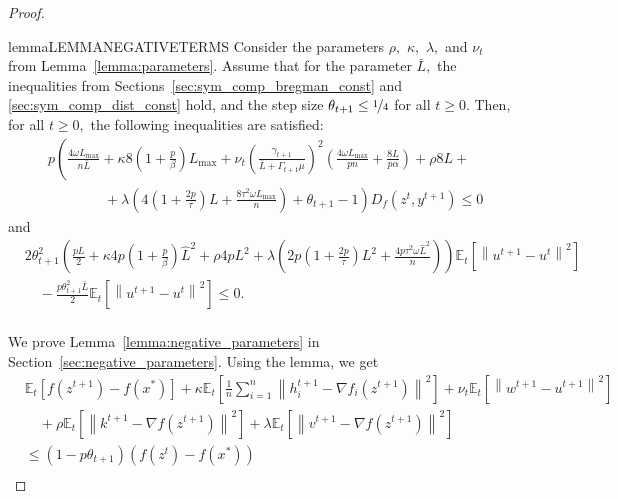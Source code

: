 \documentclass{article} %
\newcommand{\norm}[1]{\left\| #1 \right\|}
\newcommand{\ExpSub}[2]{{\mathbb{E}}_{#1}\left[#2\right]}
\theoremstyle{plain}
\theoremstyle{definition}
\theoremstyle{remark}
\begin{document}
\begin{proof}
\begin{restatable}{lemma}{LEMMANEGATIVETERMS}
    \label{lemma:negative_parameters}
    Consider the parameters $\rho,$ $\kappa,$ $\lambda,$ and $\nu_{t}$ from Lemma~\ref{lemma:parameters}. Assume that for the parameter $\bar{L},$ the inequalities from Sections~\ref{sec:sym_comp_bregman_const} and \ref{sec:sym_comp_dist_const} hold, and the step size $\theta_{t+1} \leq \nicefrac{1}{4}$ for all $t \geq 0.$ Then, for all $t \geq 0,$ the following inequalities are satisfied:
    \begin{equation}
    \begin{aligned}
      \label{eq:lemma:negative_parameters:bregman}
      &p\left(\frac{4 \omega L_{\max}}{n \bar{L}} + \kappa 8 \left(1 + \frac{p}{\beta}\right) L_{\max} + \nu_{t} \left(\frac{\gamma_{t+1}}{\bar{L} + \Gamma_{t+1} \mu}\right)^2\left(\frac{4 \omega L_{\max}}{p n} + \frac{8L}{p \alpha}\right) + \rho 8 L +  \right. \\
    &\qquad\qquad+ \left. \lambda \left(4 \left(1 + \frac{2 p}{\tau}\right) L + \frac{8 \tau^2 \omega L_{\max}}{n}\right) + \theta_{t+1} - 1\right) D_f(z^t, y^{t+1}) \leq 0
    \end{aligned}
    \end{equation}
    and
    \begin{equation}
      \begin{aligned}
      \label{eq:lemma:negative_parameters:norm}
      &2 \theta_{t+1}^2 \left(\frac{pL}{2} + \kappa 4 p \left(1 + \frac{p}{\beta}\right) \widehat{L}^2 + \rho 4 p L^2 + \lambda \left(2 p \left(1 + \frac{2 p}{\tau}\right) L^2 + \frac{4 p \tau^2 \omega \widehat{L}^2}{n}\right) \right) \ExpSub{t}{\norm{u^{t+1} - u^t}^2} \\
    &\quad - \frac{p \theta_{t+1}^2 \bar{L}}{2} \ExpSub{t}{\norm{u^{t+1} - u^t}^2} \leq 0. \\
  \end{aligned}
\end{equation}
  \end{restatable}
  We prove Lemma~\ref{lemma:negative_parameters} in Section~\ref{sec:negative_parameters}.
  Using the lemma, we get
  \begin{align*}
    &\ExpSub{t}{f(z^{t+1}) - f(x^*)} + \kappa \ExpSub{t}{\frac{1}{n}\sum_{i=1}^n \norm{h_i^{t+1} - \nabla f_i(z^{t+1})}^2} + \nu_{t} \ExpSub{t}{\norm{w^{t+1} - u^{t+1}}^2}\\
    &\quad  + \rho \ExpSub{t}{\norm{k^{t+1} - \nabla f(z^{t+1})}^2} + \lambda \ExpSub{t}{\norm{v^{t+1} - \nabla f(z^{t+1})}^2}\\
    &\leq (1 - p\theta_{t+1}) \left(f(z^{t}) - f(x^*)\right) \\

\end{align*}
\end{proof}
\end{document}
